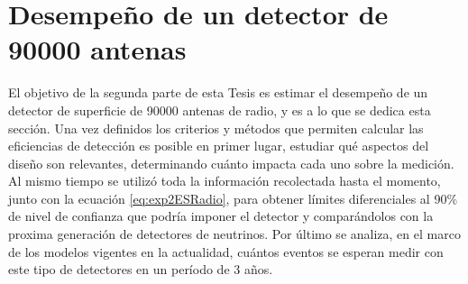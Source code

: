 



% 
% 	

	
\section{Desempe\~no de un detector de 90000 antenas}
	
	El objetivo de la segunda parte de esta Tesis es estimar el desempe\~no de un detector de superficie de 90000 antenas de radio, y es a lo que se dedica esta secci\'on.
	Una vez definidos los criterios y m\'etodos que permiten calcular las eficiencias de detecci\'on es posible en primer lugar, estudiar qu\'e aspectos del dise\~no son relevantes, determinando cu\'anto impacta cada uno sobre la medici\'on.
	Al mismo tiempo se utiliz\'o toda la informaci\'on recolectada hasta el momento, junto con la ecuaci\'on \ref{eq:exp2ESRadio}, para obtener l\'imites diferenciales al 90$\%$ de nivel de confianza que podr\'ia imponer el detector y compar\'andolos con la proxima generaci\'on de detectores de neutrinos.
	Por \'ultimo se analiza, en el marco de los modelos vigentes en la actualidad, cu\'antos eventos se esperan medir con este tipo de detectores en un per\'iodo de 3 a\~nos.
	
